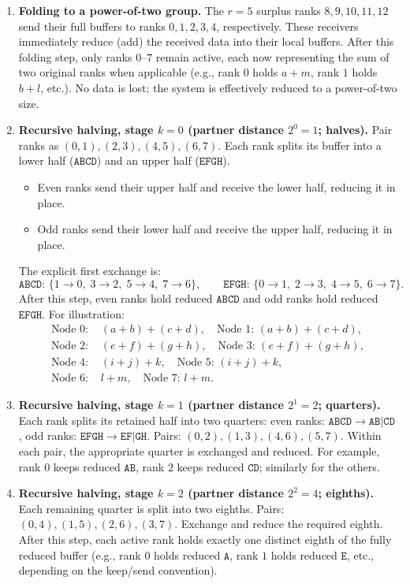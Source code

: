 \documentclass[12pt]{book}
\begin{document}
\begin{enumerate}
  \item \textbf{Folding to a power-of-two group.}
  The \(r=5\) surplus ranks \(8,9,10,11,12\) send their full buffers to ranks \(0,1,2,3,4\), respectively.
  These receivers immediately reduce (add) the received data into their local buffers.
  After this folding step, only ranks \(0\)–\(7\) remain active, each now representing the sum of two original ranks when applicable
  (e.g., rank \(0\) holds \(a+m\), rank \(1\) holds \(b+l\), etc.).
  No data is lost; the system is effectively reduced to a power-of-two size.

  \item \textbf{Recursive halving, stage \(k=0\) (partner distance \(2^0=1\); halves).}
  Pair ranks as \((0,1), (2,3), (4,5), (6,7)\).
  Each rank splits its buffer into a lower half (\(\texttt{ABCD}\)) and an upper half (\(\texttt{EFGH}\)).
  \begin{itemize}
    \item Even ranks send their upper half and receive the lower half, reducing it in place.
    \item Odd ranks send their lower half and receive the upper half, reducing it in place.
  \end{itemize}
  The explicit first exchange is:
  \[
    \texttt{ABCD: }\{1\!\to\!0,\;3\!\to\!2,\;5\!\to\!4,\;7\!\to\!6\}, \qquad
    \texttt{EFGH: }\{0\!\to\!1,\;2\!\to\!3,\;4\!\to\!5,\;6\!\to\!7\}.
  \]
  After this step, even ranks hold reduced \(\texttt{ABCD}\) and odd ranks hold reduced \(\texttt{EFGH}\).
  For illustration:
  \[
  \begin{aligned}
  \text{Node 0: } & (a+b)+(c+d), \quad
  \text{Node 1: } (a+b)+(c+d), \\
  \text{Node 2: } & (e+f)+(g+h), \quad
  \text{Node 3: } (e+f)+(g+h), \\
  \text{Node 4: } & (i+j)+k, \quad
  \text{Node 5: } (i+j)+k, \\
  \text{Node 6: } & l+m, \quad
  \text{Node 7: } l+m.
  \end{aligned}
  \]

  \item \textbf{Recursive halving, stage \(k=1\) (partner distance \(2^1=2\); quarters).}
  Each rank splits its retained half into two quarters:
  even ranks: \(\texttt{ABCD} \to \texttt{AB}|\texttt{CD}\),
  odd ranks: \(\texttt{EFGH} \to \texttt{EF}|\texttt{GH}\).
  Pairs: \((0,2),(1,3),(4,6),(5,7)\).
  Within each pair, the appropriate quarter is exchanged and reduced.
  For example, rank \(0\) keeps reduced \(\texttt{AB}\), rank \(2\) keeps reduced \(\texttt{CD}\); similarly for the others.

  \item \textbf{Recursive halving, stage \(k=2\) (partner distance \(2^2=4\); eighths).}
  Each remaining quarter is split into two eighths.
  Pairs: \((0,4),(1,5),(2,6),(3,7)\).
  Exchange and reduce the required eighth.
  After this step, each active rank holds exactly one distinct eighth of the fully reduced buffer
  (e.g., rank \(0\) holds reduced \(\texttt{A}\), rank \(1\) holds reduced \(\texttt{E}\), etc.,
  depending on the keep/send convention).
\end{enumerate}
\end{document}
